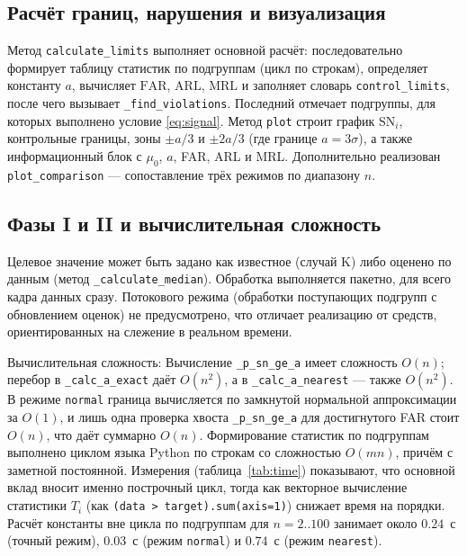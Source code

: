 \documentclass[11pt,a4paper]{article}
\newcommand{\SN}{\mathrm{SN}}
\begin{document}
\subsection{Расчёт границ, нарушения и визуализация}

Метод \texttt{calculate\_limits} выполняет основной расчёт: последовательно
формирует таблицу статистик по подгруппам (цикл по строкам), определяет
константу $a$, вычисляет $\mathrm{FAR}$, $\mathrm{ARL}$, $\mathrm{MRL}$ и
заполняет словарь \texttt{control\_limits}, после чего вызывает
\texttt{\_find\_violations}. Последний отмечает подгруппы, для которых
выполнено условие \eqref{eq:signal}. Метод \texttt{plot} строит график $\SN_i$, 
контрольные границы, зоны $\pm a/3$ и $\pm 2a/3$ (где границе $a=3\sigma$), а также
информационный блок с $\mu_0$, $a$, FAR, ARL и MRL. Дополнительно реализован
\texttt{plot\_comparison} --- сопоставление трёх режимов по диапазону $n$.

\subsection{Фазы I и II и вычислительная сложность}

Целевое значение может быть задано как известное (случай K) либо оценено по
данным (метод \texttt{\_calculate\_median}). Обработка выполняется пакетно,
для всего кадра данных сразу. Потокового режима (обработки
поступающих подгрупп с обновлением оценок) не предусмотрено, что отличает
реализацию от средств, ориентированных на слежение в реальном времени.

Вычислительная сложность: Вычисление \texttt{\_p\_sn\_ge\_a} имеет сложность
$O(n)$; перебор в \texttt{\_calc\_a\_exact} даёт $O(n^2)$, а в
\texttt{\_calc\_a\_nearest} --- также $O(n^2)$. В режиме \texttt{normal} 
граница вычисляется по замкнутой нормальной аппроксимации за $O(1)$, и лишь
одна проверка хвоста \texttt{\_p\_sn\_ge\_a} для достигнутого FAR стоит
$O(n)$, что даёт суммарно $O(n)$. Формирование статистик по
подгруппам выполнено циклом языка Python по строкам со сложностью
$O(mn)$, причём с заметной постоянной. Измерения (таблица~\ref{tab:time})
показывают, что основной вклад вносит именно построчный цикл, тогда как
векторное вычисление статистики $T_i$ (как \texttt{(data > target).sum(axis=1)})
снижает время на порядки. Расчёт константы вне цикла по подгруппам для
$n=2..100$ занимает около $0.24$~с (точный режим), $0.03$~с
(режим \texttt{normal}) и $0.74$~с (режим \texttt{nearest}).
\end{document}
